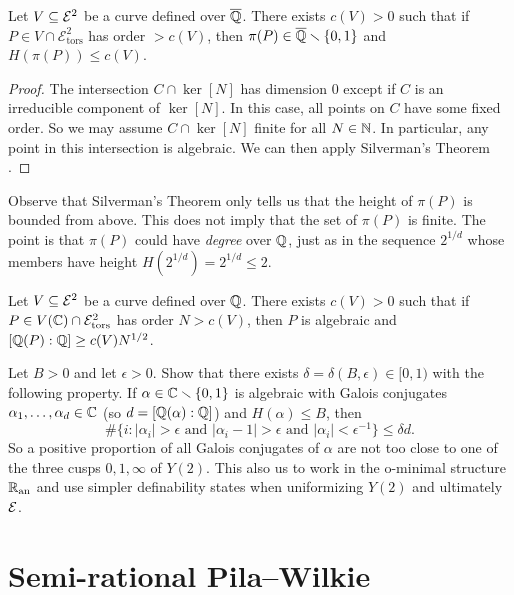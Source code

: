 \begin{theorem}
  Let $V\subseteq {\mathcal E}^2$ be a curve defined over ${\overline{\mathbb{Q}}}$. There exists 
  $c(V)>0$ such that if $P\in V\cap\mathcal{E}^2_{\mathrm{tors}}$  has
  order $>c(V)$, then $\pi(P)\in {\overline{\mathbb{Q}}}\smallsetminus\{0,1\}$ and $H(\pi(P))\le c(V)$. 
\end{theorem}
\begin{proof}
  The intersection $C\cap \ker[N]$ has dimension $0$ except if $C$ is
  an irreducible component of $\ker[N]$. In this case, all points on
  $C$ have some fixed order. So we may assume $C\cap \ker[N]$ finite
  for all $N\in{\mathbb{N}}$. In particular, any point in this intersection is
  algebraic. We can then apply Silverman's Theorem \cite{Silverman}. 
\end{proof}

Observe that Silverman's Theorem only tells us that the height of
$\pi(P)$ is bounded from above. This does not imply that the set of
$\pi(P)$ is finite. The point is that  $\pi(P)$ could have
\textit{degree} over ${\mathbb{Q}}$,
just as in the sequence $2^{1/d}$ whose members have height
$H(2^{1/d})=2^{1/d}\le 2$. 


\begin{corollary}
  \label{cor:davidsilverman}
  Let $V\subseteq {\mathcal E}^2$ be a curve defined over ${\mathbb{Q}}$. There exists 
  $c(V)>0$ such that if $P\in V({\mathbb{C}})\cap\mathcal{E}^2_{\mathrm{tors}}$  has
  order $N>c(V)$, then $P$ is algebraic and 
  $[{\mathbb{Q}}(P):{\mathbb{Q}}] \ge c(V) N^{1/2}$. 
\end{corollary}

\begin{exercise}
  Let $B>0$ and  let $\epsilon > 0$. Show that there exists
  $\delta =\delta(B,\epsilon)\in [0,1)$ with the following property. If
  $\alpha\in{\mathbb{C}}\smallsetminus\{0,1\}$ is algebraic with Galois conjugates
  $\alpha_1,\ldots,\alpha_d\in{\mathbb{C}}$ (so $d=[{\mathbb{Q}}(\alpha):{\mathbb{Q}}]$) and
  $H(\alpha)\le B$, then 
  \begin{equation*}
    \#\{ i : |\alpha_i|> \epsilon \text{ and
    }|\alpha_i-1|>\epsilon\text{ and }|\alpha_i|<\epsilon^{-1}\} \le
    \delta d.
  \end{equation*}
  So a positive proportion of all Galois conjugates of $\alpha$ are
  not too close to one of the three cusps $0,1,\infty$ of $Y(2)$. This
  also us to work in the o-minimal structure ${{\mathbb{R}}_{\mathrm{an}}}$ and use simpler
  definability states when uniformizing $Y(2)$ and ultimately ${\mathcal E}$. 
\end{exercise}

\section{Semi-rational Pila--Wilkie}
\label{sec:semirational}

